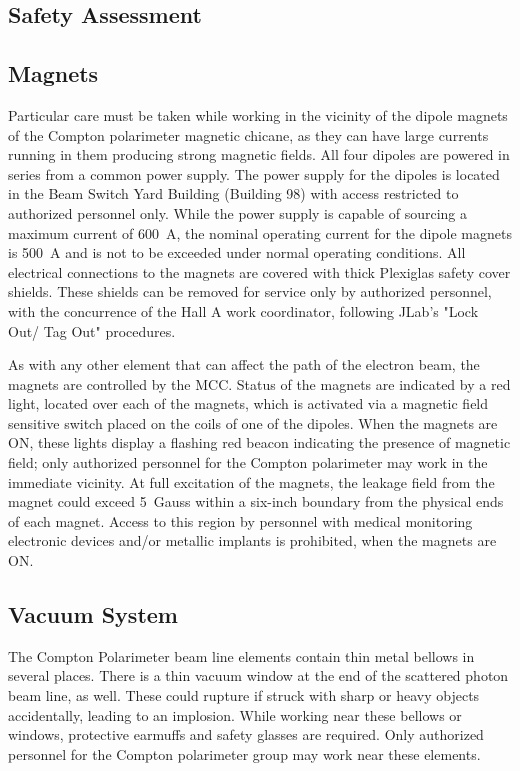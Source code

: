 \begin{safetyen}{0}{0}
\section {Safety Assessment}
\label{sec:compton_safety}
\end{safetyen}

\begin{safetyen}{10}{15}
\subsection{Magnets}

Particular care must be taken while working in the vicinity of the dipole magnets of the 
Compton polarimeter magnetic chicane, as they can have large currents
running in them producing strong magnetic fields.  All four dipoles are
powered in series from a common power supply. The power supply for
the dipoles is located in the Beam Switch Yard Building (Building 98) with access restricted to authorized personnel only.
While the power supply  is capable of sourcing  a maximum current of 600~A, the nominal operating current for the dipole magnets is 500~A and is not to be exceeded under normal operating conditions.  All electrical connections to the magnets are covered with thick Plexiglas safety cover shields. These shields can  be removed for service only by authorized personnel, with the concurrence of the Hall A work coordinator, following JLab's "Lock Out/ Tag Out" procedures.

As with any other element that can affect the path of the electron beam, the magnets are controlled by the MCC. Status of the magnets are indicated by a 
red light, located over each of the magnets, which is activated via a magnetic field sensitive switch placed on the coils of one of the dipoles. When the magnets are ON, these lights display a flashing red beacon indicating the presence of magnetic field; only authorized personnel for the Compton polarimeter may  work in the immediate vicinity. At full excitation of the magnets, the leakage field from the magnet could exceed 5~Gauss within a six-inch boundary from the physical ends of each magnet. Access to this region by personnel with  medical monitoring electronic devices and/or metallic implants is prohibited, when the magnets are ON.

\subsection{Vacuum System}
The Compton Polarimeter beam line elements contain thin metal bellows in several places. There is a thin vacuum window at the end of the scattered photon beam line, as well. These could rupture if struck with sharp or heavy objects accidentally, leading to an implosion.  While working near these bellows or windows, protective earmuffs and safety  glasses are required. Only authorized personnel for the Compton polarimeter group may  work near these elements. 


\end{safetyen}
